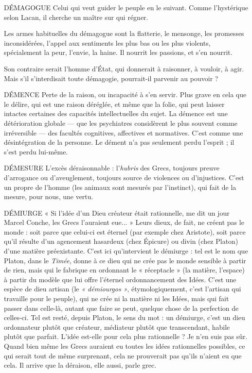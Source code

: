 DÉMAGOGUE Celui qui veut guider le peuple en le suivant. Comme l'hystérique
selon Lacan, il cherche un maître sur qui régner.

Les armes habituelles du démagogue sont la flatterie, le mensonge, les promesses
inconsidérées, l'appel aux sentiments les plus bas ou les plus violents,
spécialement la peur, l'envie, la haine. Il nourrit les passions, et s’en nourrit.

Son contraire serait l’homme d’État, qui donnerait à raisonner, à vouloir, à
agir. Mais s’il s’interdisait toute démagogie, pourrait-il parvenir au pouvoir ?

DÉMENCE Perte de la raison, ou incapacité à s’en servir. Plus grave en cela
que le délire, qui est une raison déréglée, et même que la folie,
qui peut laisser intactes certaines des capacités intellectuelles du sujet. La
démence est une détérioration globale — que les psychiatres considèrent le plus
souvent comme irréversible — des facultés cognitives, affectives et normatives.
C’est comme une désintégration de la personne. Le dément n’a pas seulement
perdu l'esprit ; il s’est perdu lui-même.

DÉMESURE  L’excès déraisonnable : l’{\it hubris} des Grecs, toujours preuve d’arrogance
ou d’aveuglement, toujours source de violences ou
d’injustices. C’est un propre de l’homme (les animaux sont mesurés par l’instinct),
qui fait de la mesure, pour nous, une vertu.

DÉMIURGE  « Si l’idée d’un Dieu créateur était rationnelle, me dit un jour
Marcel Conche, les Grecs l’auraient eue... » Leurs dieux, de
fait, ne créent pas le monde : soit parce que celui-ci est éternel (par exemple
chez Aristote), soit parce qu’il résulte d’un agencement hasardeux (chez Épicure)
ou divin (chez Platon) d’une matière préexistante. C’est ici qu’intervient
le démiurge : tel est le nom que Platon, dans le {\it Timée}, donne à ce dieu qui ne
crée pas le monde sensible à partir de rien, mais qui le fabrique en ordonnant
le « réceptacle » (la matière, l’espace) à partir du modèle que lui offre l’éternel
ordonnancement des Idées. C’est une espèce de dieu artisan (le {\it « démiourgos »},
étymologiquement, c’est l'artisan qui travaille pour le peuple), qui ne crée ni la
matière ni les Idées, mais qui fait passer dans celle-là, autant que faire se peut,
quelque chose de la perfection de celles-ci. Tel est resté, depuis Platon, le sens
du mot : un démiurge, c’est un dieu ordonnateur plutôt que créateur, médiateur
plutôt que transcendant, habile plutôt que parfait. L'idée est-elle pour cela
plus rationnelle ? Je n’en suis pas sûr. Quand bien même les Grecs auraient eu
toutes les idées rationnelles possibles, ce qui serait tout de même surprenant,
cela ne prouverait pas qu’ils n’aient eu que cela. Il arrive que la déraison, elle
aussi, parle grec.

